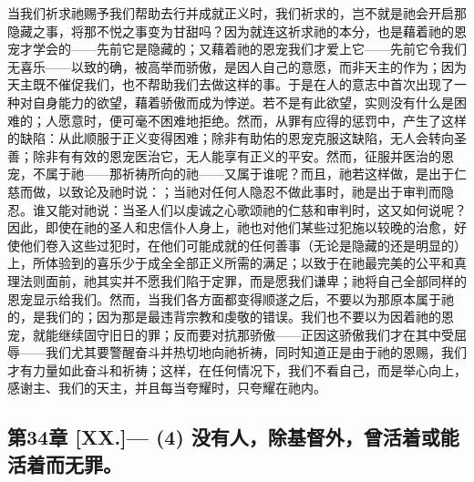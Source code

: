 当我们祈求祂赐予我们帮助去行并成就正义时，我们祈求的，岂不就是祂会开启那隐藏之事，将那不悦之事变为甘甜吗？因为就连这祈求祂的本分，也是藉着祂的恩宠才学会的——先前它是隐藏的；又藉着祂的恩宠我们才爱上它——先前它令我们无喜乐——以致的确，被高举而骄傲，是因人自己的意愿，而非天主的作为；因为天主既不催促我们，也不帮助我们去做这样的事。于是在人的意志中首次出现了一种对自身能力的欲望，藉着骄傲而成为悖逆。若不是有此欲望，实则没有什么是困难的；人愿意时，便可毫不困难地拒绝。然而，从罪有应得的惩罚中，产生了这样的缺陷：从此顺服于正义变得困难；除非有助佑的恩宠克服这缺陷，无人会转向圣善；除非有有效的恩宠医治它，无人能享有正义的平安。然而，征服并医治的恩宠，不属于祂——那祈祷所向的祂——又属于谁呢？而且，祂若这样做，是出于仁慈而做，以致论及祂时说：；当祂对任何人隐忍不做此事时，祂是出于审判而隐忍。谁又能对祂说：当圣人们以虔诚之心歌颂祂的仁慈和审判时，这又如何说呢？因此，即使在祂的圣人和忠信仆人身上，祂也对他们某些过犯施以较晚的治愈，好使他们卷入这些过犯时，在他们可能成就的任何善事（无论是隐藏的还是明显的）上，所体验到的喜乐少于成全全部正义所需的满足；以致于在祂最完美的公平和真理法则面前，祂其实并不愿我们陷于定罪，而是愿我们谦卑；祂将自己全部同样的恩宠显示给我们。然而，当我们各方面都变得顺遂之后，不要以为那原本属于祂的，是我们的；因为那是最违背宗教和虔敬的错误。我们也不要以为因着祂的恩宠，就能继续固守旧日的罪；反而要对抗那骄傲——正因这骄傲我们才在其中受屈辱——我们尤其要警醒奋斗并热切地向祂祈祷，同时知道正是由于祂的恩赐，我们才有力量如此奋斗和祈祷；这样，在任何情况下，我们不看自己，而是举心向上，感谢主、我们的天主，并且每当夸耀时，只夸耀在祂内。\par


\subsection{第34章 [XX.]— (4) 没有人，除基督外，曾活着或能活着而无罪。}

